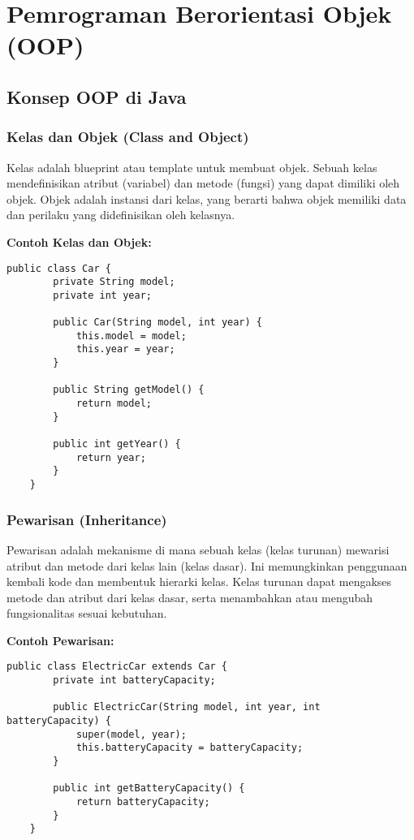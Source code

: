 \chapter{Pemrograman Berorientasi Objek (OOP)}

\section{Konsep OOP di Java}

\subsection{Kelas dan Objek (Class and Object)}

Kelas adalah blueprint atau template untuk membuat objek. Sebuah kelas mendefinisikan atribut (variabel) dan metode (fungsi) yang dapat dimiliki oleh objek. Objek adalah instansi dari kelas, yang berarti bahwa objek memiliki data dan perilaku yang didefinisikan oleh kelasnya.

\textbf{Contoh Kelas dan Objek:}

\begin{lstlisting}[style=JavaStyle]
	public class Car {
		private String model;
		private int year;
		
		public Car(String model, int year) {
			this.model = model;
			this.year = year;
		}
		
		public String getModel() {
			return model;
		}
		
		public int getYear() {
			return year;
		}
	}
\end{lstlisting}

\subsection{Pewarisan (Inheritance)}

Pewarisan adalah mekanisme di mana sebuah kelas (kelas turunan) mewarisi atribut dan metode dari kelas lain (kelas dasar). Ini memungkinkan penggunaan kembali kode dan membentuk hierarki kelas. Kelas turunan dapat mengakses metode dan atribut dari kelas dasar, serta menambahkan atau mengubah fungsionalitas sesuai kebutuhan.

\textbf{Contoh Pewarisan:}

\begin{lstlisting}[style=JavaStyle]
	public class ElectricCar extends Car {
		private int batteryCapacity;
		
		public ElectricCar(String model, int year, int batteryCapacity) {
			super(model, year);
			this.batteryCapacity = batteryCapacity;
		}
		
		public int getBatteryCapacity() {
			return batteryCapacity;
		}
	}
\end{lstlisting}

